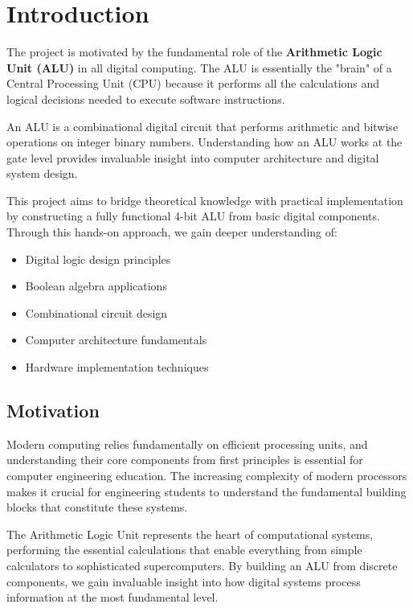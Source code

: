 \chapter{Introduction}

The project is motivated by the fundamental role of the \textbf{Arithmetic Logic Unit (ALU)} in all digital computing. The ALU is essentially the "brain" of a Central Processing Unit (CPU) because it performs all the calculations and logical decisions needed to execute software instructions.

An ALU is a combinational digital circuit that performs arithmetic and bitwise operations on integer binary numbers. Understanding how an ALU works at the gate level provides invaluable insight into computer architecture and digital system design.

This project aims to bridge theoretical knowledge with practical implementation by constructing a fully functional 4-bit ALU from basic digital components. Through this hands-on approach, we gain deeper understanding of:

\begin{itemize}
    \item Digital logic design principles
    \item Boolean algebra applications
    \item Combinational circuit design
    \item Computer architecture fundamentals
    \item Hardware implementation techniques
\end{itemize}

\section{Motivation}

Modern computing relies fundamentally on efficient processing units, and understanding their core components from first principles is essential for computer engineering education. The increasing complexity of modern processors makes it crucial for engineering students to understand the fundamental building blocks that constitute these systems.

The Arithmetic Logic Unit represents the heart of computational systems, performing the essential calculations that enable everything from simple calculators to sophisticated supercomputers. By building an ALU from discrete components, we gain invaluable insight into how digital systems process information at the most fundamental level.

